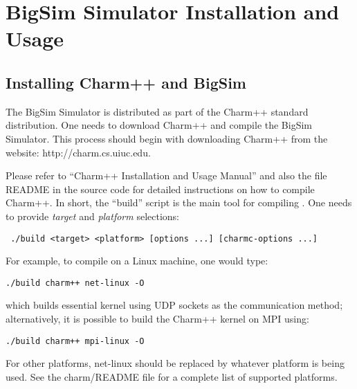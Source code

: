 \section{BigSim Simulator Installation and Usage}
\label{install}

\subsection{Installing Charm++ and BigSim}

    The BigSim Simulator is distributed as part of the Charm++ standard distribution.
One needs to download Charm++ and compile the BigSim Simulator.
This process should begin with downloading Charm++ from the website:
http://charm.cs.uiuc.edu.

Please refer to ``Charm++ Installation and Usage Manual'' and also the file
README in the source code for detailed instructions on how to compile Charm++.
In short, the ``build'' script is the main tool for compiling \charmpp{}.  One
        needs to provide {\em target} and {\em platform} selections: 
\begin{verbatim} ./build <target> <platform> [options ...] [charmc-options ...] \end{verbatim}

For example, to compile on a Linux machine, one would type:
\begin{verbatim}
./build charm++ net-linux -O
\end{verbatim}

\noindent
        which builds essential \charmpp{} kernel using UDP sockets as the
communication method; 
        alternatively, it is possible to build the Charm++ kernel on MPI using:
\begin{verbatim}
./build charm++ mpi-linux -O
\end{verbatim}

        For other platforms, net-linux should be replaced by whatever platform is being used. 
See the charm/README file for a complete list of supported platforms.


